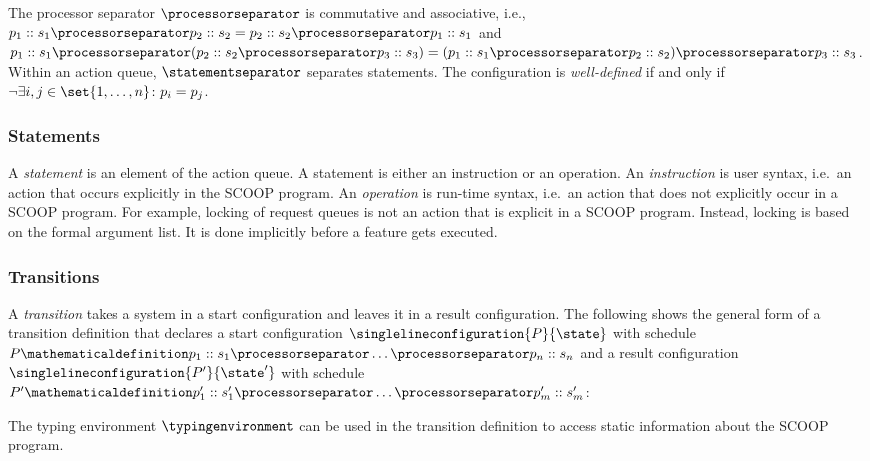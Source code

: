 
The processor separator $\processorseparator$ is commutative and associative, i.e., $p_{1} :: s_{1} \processorseparator p_{2} :: s_{2} = p_{2} :: s_{2} \processorseparator p_{1} :: s_{1}$ and $p_{1} :: s_{1} \processorseparator (p_{2} :: s_{2} \processorseparator p_{3} :: s_{3}) = (p_{1} :: s_{1} \processorseparator p_{2} :: s_{2}) \processorseparator p_{3} :: s_{3}$. Within an action queue, $\statementseparator$ separates statements. The configuration is \emph{well-defined} if and only if $\neg \exists i, j \in \set{1, \ldots, n} \colon p_{i} = p_{j}$.

\subsubsection{Statements}
A \emph{statement} is an element of the action queue. A statement is either an instruction or an operation. An \emph{instruction} is user syntax, i.e.\ an action that occurs explicitly in the SCOOP program. An \emph{operation} is run-time syntax, i.e.\ an action that does not explicitly occur in a SCOOP program. For example, locking of request queues is not an action that is explicit in a SCOOP program. Instead, locking is based on the formal argument list. It is done implicitly before a feature gets executed.

\subsubsection{Transitions}
A \emph{transition} takes a system in a start configuration and leaves it in a result configuration. The following shows the general form of a transition definition that declares a start configuration $\singlelineconfiguration{P}{\state}$ with schedule $P \mathematicaldefinition p_{1} :: s_{1} \processorseparator \ldots \processorseparator p_{n} :: s_{n}$ and a result configuration $\singlelineconfiguration{P'}{\state'}$ with schedule $P' \mathematicaldefinition p'_{1} :: s'_{1} \processorseparator \ldots \processorseparator p'_{m} :: s'_{m}$:

\isolatedsinglelinetransition
	{}
	{}

The typing environment $\typingenvironment$ can be used in the transition definition to access static information about the SCOOP program.

